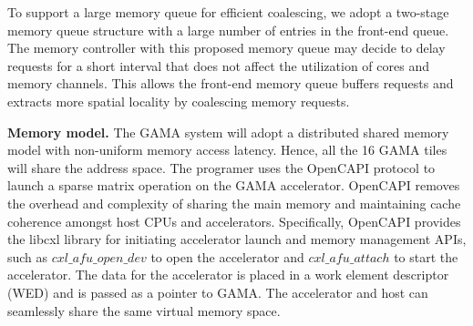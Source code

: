 To support a large memory queue for efficient coalescing, 
we adopt a two-stage memory queue structure with a large number of entries in the front-end queue. 
The memory controller with this proposed  memory queue may decide to delay requests for a short interval that does not affect the utilization of cores and memory channels. 
This allows the front-end memory queue buffers requests and extracts more spatial locality by coalescing memory requests. 

\vspace{3pt}
\noindent
\textbf{Memory model.} 
The GAMA system will adopt a distributed shared memory model with non-uniform memory access latency. 
Hence, all the 16 GAMA tiles will share the address space. 
The programer uses the OpenCAPI protocol to launch a sparse matrix operation on the GAMA accelerator. 
OpenCAPI removes the overhead and complexity of sharing the main memory and maintaining cache coherence amongst host CPUs and accelerators.
Specifically, OpenCAPI provides the libcxl library for initiating accelerator launch and memory management APIs, such as $cxl\_afu\_open\_dev$ to open the accelerator and $cxl\_afu\_attach$ to start the accelerator. 
The data for the accelerator is placed in a work element descriptor (WED) and is passed as a pointer to GAMA. 
The accelerator and host can seamlessly share the same virtual memory space. 

